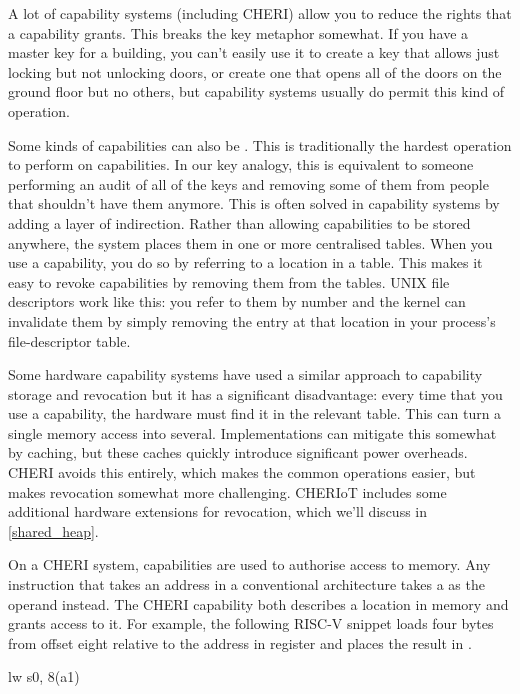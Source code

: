 A lot of capability systems (including CHERI) allow you to reduce the rights that a capability grants.
This breaks the key metaphor somewhat.
If you have a master key for a building, you can't easily use it to create a key that allows just locking but not unlocking doors, or create one that opens all of the doors on the ground floor but no others, but capability systems usually do permit this kind of operation.

Some kinds of capabilities can also be .
This is traditionally the hardest operation to perform on capabilities.
In our key analogy, this is equivalent to someone performing an audit of all of the keys and removing some of them from people that shouldn't have them anymore.
This is often solved in capability systems by adding a layer of indirection.
Rather than allowing capabilities to be stored anywhere, the system places them in one or more centralised tables.
When you use a capability, you do so by referring to a location in a table.
This makes it easy to revoke capabilities by removing them from the tables.
UNIX file descriptors work like this: you refer to them by number and the kernel can invalidate them by simply removing the entry at that location in your process's file-descriptor table.

Some hardware capability systems have used a similar approach to capability storage and revocation but it has a significant disadvantage: every time that you use a capability, the hardware must find it in the relevant table.
This can turn a single memory access into several.
Implementations can mitigate this somewhat by caching, but these caches quickly introduce significant power overheads.
CHERI avoids this entirely, which makes the common operations easier, but makes revocation somewhat more challenging.
CHERIoT includes some additional hardware extensions for revocation, which we'll discuss in \ref{shared_heap}.

On a CHERI system, capabilities are used to authorise access to memory.
Any instruction that takes an address in a conventional architecture takes a  as the operand instead.
The CHERI capability both describes a location in memory and grants access to it.
For example, the following RISC-V snippet loads four bytes from offset eight relative to the address in register  and places the result in .

\begin{asmsnippet}
	lw	s0, 8(a1)
\end{asmsnippet}

